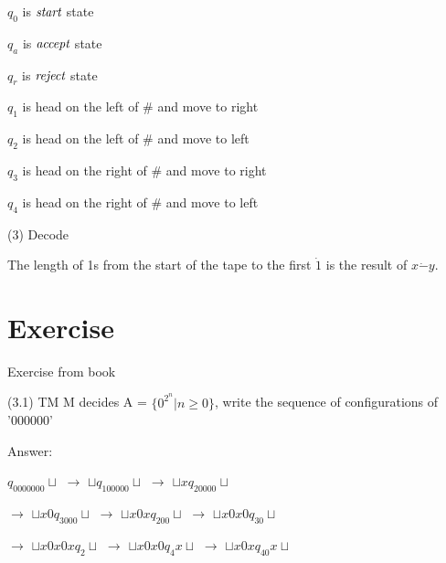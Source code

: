 \documentclass{article}
\begin{document}
\vspace{5mm} 

\hspace{0.5cm}$q_0$ is $\emph{start}$ state

\hspace{0.5cm}$q_a$ is $\emph{accept}$ state

\hspace{0.5cm}$q_r$ is $\emph{reject}$ state

\hspace{0.5cm}$q_1$ is head on the left of \# and move to right

\hspace{0.5cm}$q_2$ is head on the left of \# and move to left

\hspace{0.5cm}$q_3$ is head on the right of \# and move to right

\hspace{0.5cm}$q_4$ is head on the right of \# and move to left

\vspace{5mm}

(3) Decode 

\hspace{0.5cm}The length of 1s from the start of the tape to the first $\dot{1}$ is the result of $x \dot{-} y$.
 
\vspace{5mm}

\section{Exercise}

Exercise from book 

\vspace{5mm}

\hspace{0.5cm}(3.1) TM M decides A = $\{0^{2^n} | n \ge 0\}$, write the sequence of configurations of '000000'

\hspace{0.5cm}Answer:

\hspace{0.5cm} $q_0000000{\sqcup}$ $\to$ ${\sqcup}q_100000{\sqcup}$ $\to$ ${\sqcup}xq_20000{\sqcup}$ 

$\to$ ${\sqcup}x0q_3000{\sqcup}$ $\to$ ${\sqcup}x0xq_200{\sqcup}$ $\to$ ${\sqcup}x0x0q_30{\sqcup}$ 

$\to$ ${\sqcup}x0x0xq_2{\sqcup}$ $\to$ ${\sqcup}x0x0q_4x{\sqcup}$ $\to$ ${\sqcup}x0xq_40x{\sqcup}$ 
\end{document}
